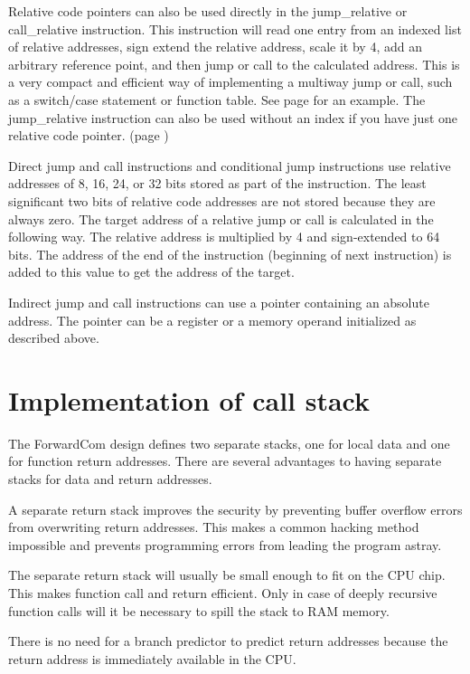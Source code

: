 \documentclass[forwardcom.tex]{subfiles}
\begin{document}
Relative code pointers can also be used directly in the jump\_relative or call\_relative instruction. 
This instruction will read one entry from an indexed list of relative addresses, sign extend the relative address, scale it by 4, add an arbitrary reference point, and then jump or call to the calculated address. This is a very compact and efficient way of implementing a multiway jump or call, such as a switch/case statement or function table. 
See page \pageref{exampleSwitchCase} for an example. The jump\_relative  instruction can also be used without an index if you have just one relative code pointer. (page \pageref{exampleRelFuncPointer})
\vspace{4mm}

Direct jump and call instructions and conditional jump instructions use relative addresses of 8, 16, 24, or 32 bits stored as part of the instruction. The least significant two bits of relative code addresses are not stored because they are always zero. The target address of a relative jump or call is calculated in the following way. The relative address is multiplied by 4 and sign-extended to 64 bits. The address of the end of the instruction (beginning of next instruction) is added to this value to get the address of the target. \vv

Indirect jump and call instructions can use a pointer containing an absolute address. 
The pointer can be a register or a memory operand initialized as described above. 
\vv

\section{Implementation of call stack} \label{callStackImplementation}
The ForwardCom design defines two separate stacks, one for local data and one for function return addresses. There are several advantages to having separate stacks for data and return addresses. 
\vv

A separate return stack improves the security by preventing buffer overflow errors from overwriting return addresses. This makes a common hacking method impossible and prevents programming errors from leading the program astray.
\vv

The separate return stack will usually be small enough to fit on the CPU chip. This makes function call and return efficient. Only in case of deeply recursive function calls will it be necessary to spill the stack to RAM memory.
\vv

There is no need for a branch predictor to predict return addresses because the return address is immediately available in the CPU.
\vv
\end{document}
